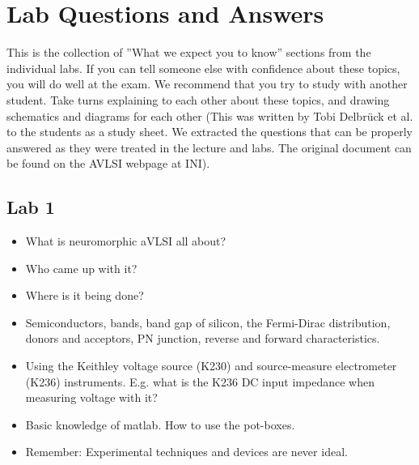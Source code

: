 \documentclass[main]{subfiles}
\begin{document}
\section{Lab Questions and Answers}
This is the collection of ”What we expect you to know” sections from the individual labs. If you can tell someone else with confidence about these topics, you will do well at the exam. We recommend that you try to study with another student. Take turns explaining to each other about these topics, and drawing schematics and diagrams for each other (This was written by Tobi Delbrück et al. to the students as a study sheet. We extracted the questions that can be properly answered as they were treated in the lecture and labs. The original document can be found on the AVLSI webpage at INI).
\subsection{Lab 1}
\begin{itemize}
\item What is neuromorphic aVLSI all about? 
\item Who came up with it?
\item Where is it being done?
\item Semiconductors, bands, band gap of silicon, the Fermi-Dirac distribution, donors and acceptors, PN junction, reverse and forward characteristics.
\item Using the Keithley voltage source (K230) and source-measure electrometer (K236) instruments. E.g. what is the K236 DC input impedance when measuring voltage with it? 
\item Basic knowledge of matlab. How to use the pot-boxes.
\item Remember: Experimental techniques and devices are never ideal.
\end{itemize}
\end{document}
